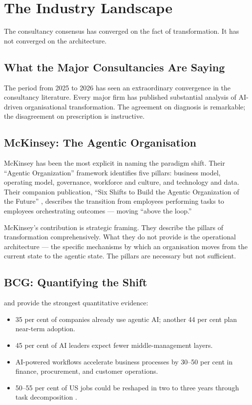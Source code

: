 \chapter{The Industry Landscape}
\label{ch:industry-landscape}

\epigraph{The consultancy consensus has converged on the fact of transformation. It has not converged on the architecture.}{}

\section{What the Major Consultancies Are Saying}

The period from 2025 to 2026 has seen an extraordinary convergence in the consultancy literature. Every major firm has published substantial analysis of AI-driven organisational transformation. The agreement on diagnosis is remarkable; the disagreement on prescription is instructive.

\section{McKinsey: The Agentic Organisation}

McKinsey has been the most explicit in naming the paradigm shift. Their ``Agentic Organization'' framework \parencite{McKinseyAgenticOrg2026} identifies five pillars: business model, operating model, governance, workforce and culture, and technology and data. Their companion publication, ``Six Shifts to Build the Agentic Organization of the Future'' \parencite{McKinseySixShifts2026}, describes the transition from employees performing tasks to employees orchestrating outcomes --- moving ``above the loop.''

McKinsey's contribution is strategic framing. They describe the pillars of transformation comprehensively. What they do not provide is the operational architecture --- the specific mechanisms by which an organisation moves from the current state to the agentic state. The pillars are necessary but not sufficient.

\section{BCG: Quantifying the Shift}

\textcite{BCGAgenticShift2025} and \textcite{BCGAgenticEnterprise2025} provide the strongest quantitative evidence:

\begin{itemize}
  \item 35 per cent of companies already use agentic AI; another 44 per cent plan near-term adoption.
  \item 45 per cent of AI leaders expect fewer middle-management layers.
  \item AI-powered workflows accelerate business processes by 30--50 per cent in finance, procurement, and customer operations.
  \item 50--55 per cent of US jobs could be reshaped in two to three years through task decomposition \parencite{BCGJobsReshaping2026}.
\end{itemize}

